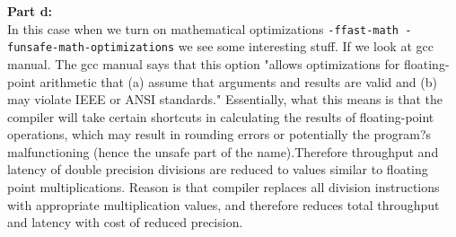 \documentclass[letterpaper, 11pt]{article}
\begin{document}
\textbf{Part d:} \\
In this case when we turn on mathematical optimizations \texttt{-ffast-math -funsafe-math-optimizations} we see some interesting stuff. If we look at gcc manual. The gcc manual says that this option "allows optimizations for floating-point arithmetic that (a) assume that arguments and results are valid and (b) may violate IEEE or ANSI standards."
Essentially, what this means is that the compiler will take certain shortcuts in calculating the results of floating-point operations, which may result in rounding errors or potentially the program?s malfunctioning (hence the unsafe part of the name).Therefore throughput and latency of double precision divisions are reduced to values similar to  floating point multiplications. Reason
is that compiler replaces all division instructions with appropriate multiplication values, and therefore
reduces total throughput and latency with cost of reduced precision.
\bigskip

\clearpage

\end{document}
